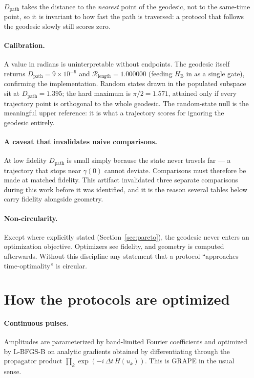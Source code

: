 \documentclass[10pt]{article}
\newcommand{\Dpath}{D_{\mathrm{path}}}
\newcommand{\Rlen}{\mathcal{R}_{\mathrm{length}}}
\newcommand{\HB}{H_{\mathrm{B}}}
\begin{document}
$\Dpath$ takes the distance to the \emph{nearest} point of the geodesic, not to
the same-time point, so it is invariant to how fast the path is traversed: a
protocol that follows the geodesic slowly still scores zero.

\paragraph{Calibration.} A value in radians is uninterpretable without endpoints.
The geodesic itself returns $\Dpath=9\times10^{-9}$ and $\Rlen=1.000000$ (feeding
$\HB$ in as a single gate), confirming the implementation. Random states drawn in
the populated subspace sit at $\Dpath=1.395$; the hard maximum is $\pi/2=1.571$,
attained only if every trajectory point is orthogonal to the whole geodesic.
The random-state null is the meaningful upper reference: it is what a trajectory
scores for ignoring the geodesic entirely.

\paragraph{A caveat that invalidates naive comparisons.} At low fidelity $\Dpath$
is small simply because the state never travels far --- a trajectory that stops
near $\gamma(0)$ cannot deviate. Comparisons must therefore be made at matched
fidelity. This artifact invalidated three separate comparisons during this work
before it was identified, and it is the reason several tables below carry fidelity
alongside geometry.

\paragraph{Non-circularity.} Except where explicitly stated
(Section~\ref{sec:pareto}), the geodesic never enters an optimization objective.
Optimizers see fidelity, and geometry is computed afterwards. Without this
discipline any statement that a protocol ``approaches time-optimality'' is
circular.

\section{How the protocols are optimized}

\paragraph{Continuous pulses.} Amplitudes are parameterized by band-limited
Fourier coefficients and optimized by L-BFGS-B on analytic gradients obtained by
differentiating through the propagator product
$\prod_k \exp(-i\,\Delta t\,H(u_k))$. This is GRAPE in the usual sense.
\end{document}
